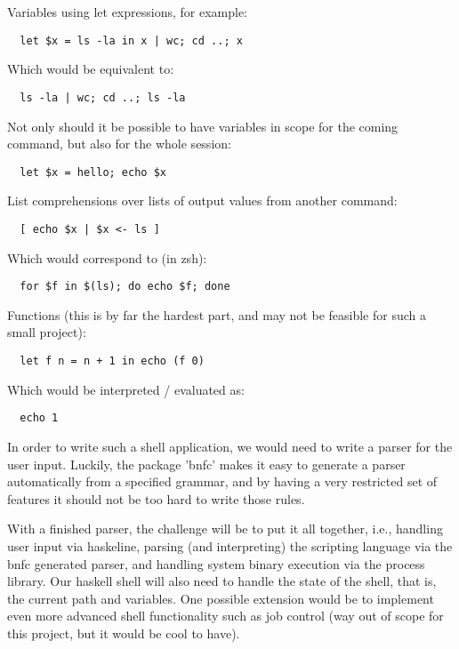 \documentclass[11pt,a4paper]{article}
\begin{document}
Variables using let expressions, for example:
\begin{verbatim}
  let $x = ls -la in x | wc; cd ..; x
\end{verbatim}

Which would be equivalent to:

\begin{verbatim}
  ls -la | wc; cd ..; ls -la
\end{verbatim}

Not only should it be possible to have variables in scope for the coming
command, but also for the whole session:

\begin{verbatim}
  let $x = hello; echo $x
\end{verbatim}

List comprehensions over lists of output values from another command:

\begin{verbatim}
  [ echo $x | $x <- ls ]
\end{verbatim}

Which would correspond to (in zsh):

\begin{verbatim}
  for $f in $(ls); do echo $f; done
\end{verbatim}

Functions (this is by far the hardest part, and may not be feasible for such a small project):

\begin{verbatim}
  let f n = n + 1 in echo (f 0)
\end{verbatim}

Which would be interpreted / evaluated as:

\begin{verbatim}
  echo 1
\end{verbatim}

In order to write such a shell application, we would need to write a parser for
the user input. Luckily, the package 'bnfc' makes it easy to generate a parser
automatically from a specified grammar, and by having a very restricted set of
features it should not be too hard to write those rules.

With a finished parser, the challenge will be to put it all together, i.e.,
handling user input via haskeline, parsing (and interpreting) the scripting
language via the bnfc generated parser, and handling system binary execution via
the process library. Our haskell shell will also need to handle the state of the
shell, that is, the current path and variables. One possible extension would be
to implement even more advanced shell functionality such as job control (way out
of scope for this project, but it would be cool to have).
\end{document}
